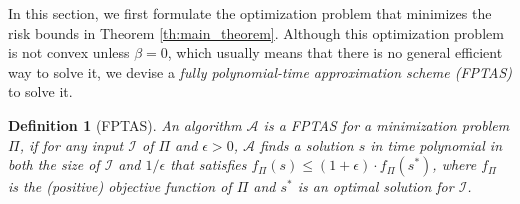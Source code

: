 \documentclass[letterpaper]{article} %
\newtheorem{definition}{Definition}
\newcommand{\red}[1]{\textcolor{red}{#1}}
\newcommand{\todo}[1]{\red{\textsc{todo:} #1}}
\begin{document}
In this section, we first formulate the optimization problem that minimizes the risk bounds in Theorem \ref{th:main_theorem}. 
Although this optimization problem is not convex unless $\beta=0$, which usually means that there is no general efficient way to solve it, we devise a \emph{fully polynomial-time approximation scheme (FPTAS)} to solve it.
\begin{definition}[FPTAS]
  An algorithm $\mathcal{A}$ is a FPTAS for a minimization problem $\Pi$, if for any input $\mathcal{I}$ of $\Pi$ and $\epsilon>0$, $\mathcal{A}$ finds a solution $s$ in time polynomial in both the size of $\mathcal{I}$ and $1/\epsilon$ that satisfies $f_\Pi(s)\le (1+\epsilon) \cdot f_\Pi(s^*)$,
  where $f_\Pi$ is the (positive) objective function of $\Pi$ and $s^*$ is an optimal solution for $\mathcal{I}$.
\end{definition}
\end{document}
